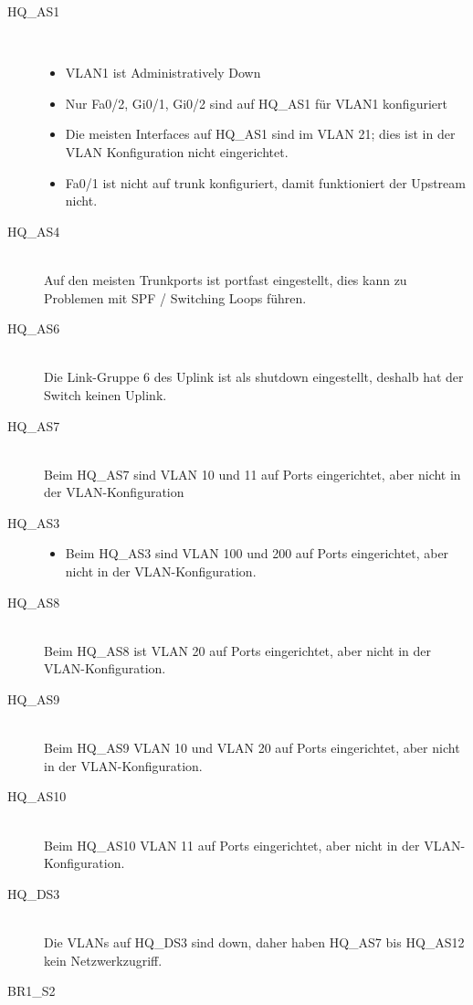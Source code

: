 \begin{description}
	\item[HQ\_AS1] \hfill \\
	  \begin{itemize}
		  \item VLAN1 ist Administratively Down
		  \item Nur Fa0/2, Gi0/1, Gi0/2 sind auf HQ\_AS1 für VLAN1 konfiguriert
		  \item Die meisten Interfaces auf HQ\_AS1 sind im VLAN 21; dies ist in  der VLAN Konfiguration nicht eingerichtet.
		  \item Fa0/1 ist nicht auf trunk konfiguriert, damit funktioniert der Upstream nicht.
	  \end{itemize}
	\item[HQ\_AS4] \hfill \\
	 Auf den meisten Trunkports ist portfast eingestellt, dies kann zu Problemen mit SPF / Switching Loops führen.
	\item[HQ\_AS6] \hfill \\
	 Die Link-Gruppe 6 des Uplink ist als shutdown eingestellt, deshalb hat der Switch keinen Uplink.
	\item[HQ\_AS7] \hfill \\
	 Beim HQ\_AS7 sind VLAN 10 und 11 auf Ports eingerichtet, aber nicht in der VLAN-Konfiguration
	\item[HQ\_AS3] \hfill 
	\begin{itemize}
		\item Beim HQ\_AS3 sind VLAN 100 und 200 auf Ports eingerichtet, aber nicht in der VLAN-Konfiguration.
	\end{itemize}
	\item[HQ\_AS8] \hfill \\
	 Beim HQ\_AS8 ist VLAN 20 auf Ports eingerichtet, aber nicht in der VLAN-Konfiguration.
	\item[HQ\_AS9] \hfill \\
	 Beim HQ\_AS9 VLAN 10 und VLAN 20 auf Ports eingerichtet, aber nicht in der VLAN-Konfiguration.
	\item[HQ\_AS10] \hfill \\
	 Beim HQ\_AS10 VLAN 11 auf Ports eingerichtet, aber nicht in der VLAN-Konfiguration.
	\item[HQ\_DS3] \hfill \\
	 Die VLANs auf HQ\_DS3 sind down, daher haben HQ\_AS7 bis HQ\_AS12 kein Netzwerkzugriff.
	\item[BR1\_S2] \hfill \\

\end{description}

